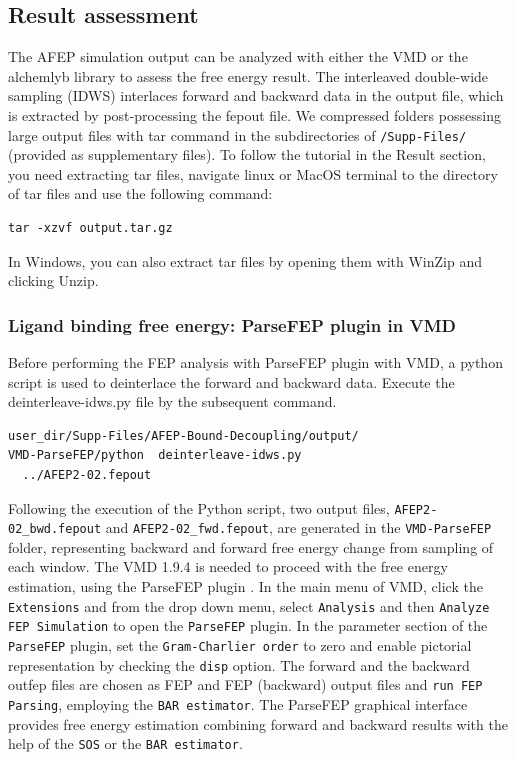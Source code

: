 \documentclass[9pt,tutorial]{livecoms}
\begin{document}
\subsection{Result assessment}
The AFEP simulation output can be analyzed with either the VMD or the alchemlyb library to assess the free energy result. The interleaved double-wide sampling (IDWS) interlaces forward and backward data in the output file, which is extracted by post-processing the fepout file. We compressed folders possessing large output files with tar command in the subdirectories of \texttt{/Supp-Files/} (provided as supplementary files). To follow the tutorial in the Result section, you need extracting tar files, navigate linux or MacOS terminal to the directory of tar files and use the following command:
\begin{verbatim}
tar -xzvf output.tar.gz
\end{verbatim}
In Windows, you can also extract tar files by opening them with WinZip and clicking Unzip.
\subsubsection{Ligand binding free energy: ParseFEP plugin in VMD}
Before performing the FEP analysis with ParseFEP plugin \cite{Liu2012} with VMD, a python script is used to deinterlace the forward and backward data. Execute the deinterleave-idws.py file by the subsequent command.
\begin{verbatim}
user_dir/Supp-Files/AFEP-Bound-Decoupling/output/
VMD-ParseFEP/python  deinterleave-idws.py
  ../AFEP2-02.fepout
\end{verbatim}
Following the execution of the Python script, two output files, \texttt{AFEP2-02\_bwd.fepout} and \texttt{AFEP2-02\_fwd.fepout}, are generated in the \texttt{VMD-ParseFEP} folder, representing backward and forward free energy change from sampling of each window. The VMD 1.9.4 is needed to proceed with the free energy estimation, using the ParseFEP plugin \cite{Liu2012}.
In the main menu of VMD, click the \texttt{Extensions} and from the drop down menu, select \texttt{Analysis} and then \texttt{Analyze FEP Simulation} to open the \texttt{ParseFEP} plugin. In the parameter section of the \texttt{ParseFEP} plugin, set the \texttt{Gram-Charlier order} to zero and enable pictorial representation by checking the \texttt{disp} option. The forward and the backward outfep files are chosen as FEP and FEP (backward) output files and \texttt{run FEP Parsing}, employing the \texttt{BAR estimator}. The ParseFEP graphical interface provides free energy estimation combining forward and backward results with the help of the \texttt{SOS} or the \texttt{BAR estimator}. 
\end{document}

